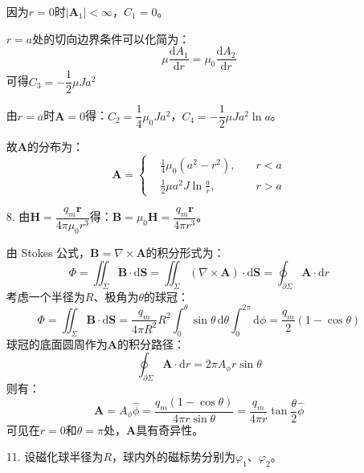 \documentclass[a4paper,fontset=none]{ctexart}
\begin{document}
\begin{itemize}
    因为$r=0$时$|\bm{A}_1|<\infty$，$C_1=0$。

    $r=a$处的切向边界条件可以化简为：
    \[
    \mu\frac{\mathrm{d}A_1}{\mathrm{d}r} = \mu_0\frac{\mathrm{d}A_2}{\mathrm{d}r}
    \]
    可得$C_3=-\dfrac{1}{2}\mu Ja^2$

    由$r=a$时$\bm{A}=0$得：$C_2=\dfrac{1}{4}\mu_0 Ja^2$，$C_4=-\dfrac{1}{2}\mu Ja^2\ln a$。

    故$\bm{A}$的分布为：
    \[
    \bm{A} =
    \left\{
        \begin{aligned}
            &\frac{1}{4}\mu_0(a^2-r^2),\quad &r<a \\
            &\frac{1}{2}\mu a^2 J\ln\frac{a}{r},\quad &r>a
        \end{aligned}
    \right.
    \]

    \item[8.]
    由$\bm{H}=\dfrac{q_m\bm{r}}{4\pi\mu_0 r^3}$得：$\bm{B}=\mu_0\bm{H}=\dfrac{q_m\bm{r}}{4\pi r^3}$。

    由 Stokes 公式，$\bm{B}=\nabla\times\bm{A}$的积分形式为：
    \[
    \Phi = \iint_\Sigma \bm{B}\cdot\mathrm{d}\bm{S} = \iint_\Sigma (\nabla\times\bm{A})\cdot\mathrm{d}\bm{S} = \oint_{\partial\Sigma} \bm{A}\cdot\mathrm{d}r
    \]
    考虑一个半径为$R$、极角为$\theta$的球冠：
    \[
    \Phi = \iint_\Sigma \bm{B}\cdot\mathrm{d}\bm{S} = \frac{q_m}{4\pi R^2}R^2 \int_0^\theta \sin\theta\,\mathrm{d}\theta \int_0^{2\pi}\mathrm{d}\phi = \frac{q_m}{2}(1-\cos\theta)
    \]
    球冠的底面圆周作为$\bm{A}$的积分路径：
    \[
    \oint_{\partial\Sigma} \bm{A}\cdot\mathrm{d}r = 2\pi A_\phi r\sin\theta
    \]
    则有：
    \[
    \bm{A} = A_\phi\hat{\phi} = \frac{q_m(1-\cos\theta)}{4\pi r\sin\theta} = \frac{q_m}{4\pi r}\tan\frac{\theta}{2}\hat{\phi}
    \]
    可见在$r=0$和$\theta=\pi$处，$\bm{A}$具有奇异性。

    \item[11.]
    设磁化球半径为$R$，球内外的磁标势分别为$\varphi_1$、$\varphi_2$。


\end{itemize}
\end{document}
